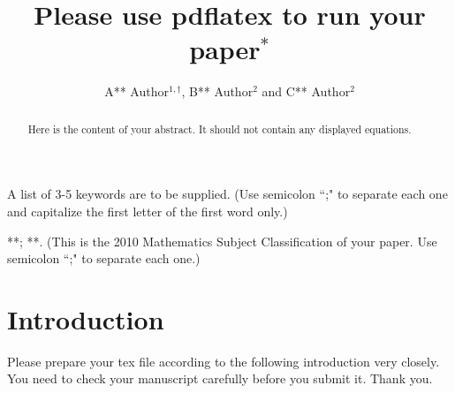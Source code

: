 \documentclass{uestcMath}
\title{Please use pdflatex to run your paper$^*$}
\author{ A** Author$^{1,\dag}$, B** Author$^2$ and C** Author$^2$}%
\date{}
\begin{document}
\baselineskip 12pt

\maketitle
\begin{abstract}
Here is the  content of your abstract. It should not contain any displayed equations.
\end{abstract}

\begin{keyword}
A list of 3-5 keywords are to be supplied. (Use semicolon ``;" to separate each one and capitalize the first letter of the first word only.)
\end{keyword}

\begin{MSC}
**; **.
(This is the 2010 Mathematics Subject Classification of your paper. Use semicolon ``;" to separate each one.)
\end{MSC}


\thispagestyle{first}

\vspace{-2mm}


\section{Introduction}
Please prepare your tex file according to the following introduction
very closely. You need to check your manuscript carefully before you submit it. Thank you.
\end{document}

